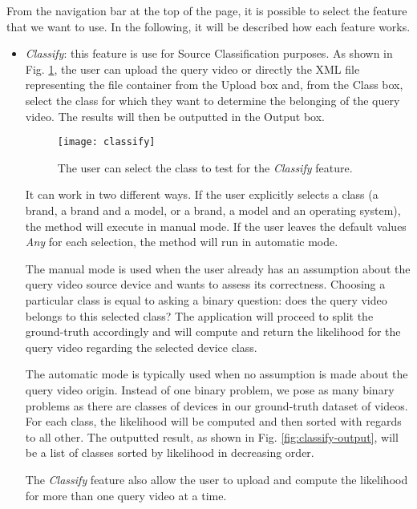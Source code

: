 From the navigation bar at the top of the page, it is possible to select the feature that we want to use. In the following, it will be described how each feature works.

\begin{itemize}

\item \emph{Classify}: this feature is use for Source Classification purposes. As shown in Fig. \ref{fig:classify}, the user can upload the query video or directly the XML file representing the file container from the Upload box and, from the Class box, select the class for which they want to determine the belonging of the query video. The results will then be outputted in the Output box. 

\begin{figure}
  \centering
  \texttt{[image: classify]}
  \caption{The user can select the class to test for the \emph{Classify} feature.}\label{fig:classify}
\end{figure}

It can work in two different ways. If the user explicitly selects a class (a brand, a brand and a model, or a brand, a model and an operating system), the method will execute in manual mode. If the user leaves the default values \emph{Any} for each selection, the method will run in automatic mode.

The manual mode is used when the user already has an assumption about the query video source device and wants to assess its correctness. Choosing a particular class is equal to asking a binary question: does the query video belongs to this selected class? The application will proceed to split the ground-truth accordingly and will compute and return the likelihood for the query video regarding the selected device class.

The automatic mode is typically used when no assumption is made about the query video origin. Instead of one binary problem, we pose as many binary problems as there are classes of devices in our ground-truth dataset of videos. For each class, the likelihood will be computed and then sorted with regards to all other. The outputted result, as shown in Fig. \ref{fig:classify-output}, will be a list of classes sorted by likelihood in decreasing order.

The \emph{Classify} feature also allow the user to upload and compute the likelihood for more than one query video at a time.


\end{itemize}
